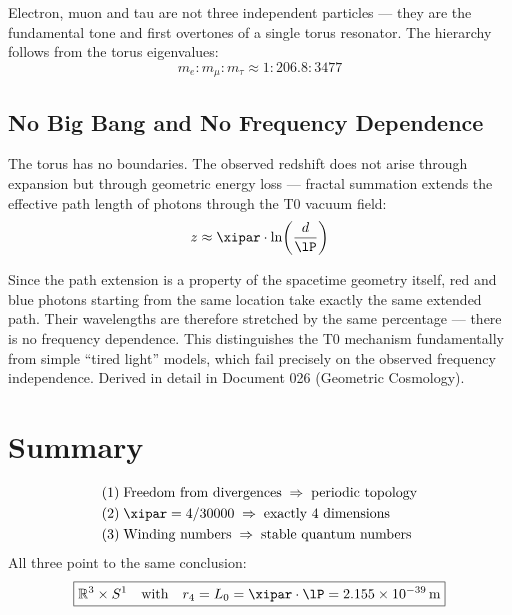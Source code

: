 Electron, muon and tau are not three independent particles — they are the fundamental tone and first overtones of a single torus resonator. The hierarchy follows from the torus eigenvalues:
\begin{equation}
	m_e : m_\mu : m_\tau \approx 1 : 206{.}8 : 3477
\end{equation}

\subsection{No Big Bang and No Frequency Dependence}

The torus has no boundaries. The observed redshift does not arise through expansion but through geometric energy loss — fractal summation extends the effective path length of photons through the T0 vacuum field:
\begin{equation}
	z \approx \xipar \cdot \ln\!\left(\frac{d}{\lP}\right)
\end{equation}

\begin{keypoint}
Since the path extension is a property of the spacetime geometry itself, red and blue photons starting from the same location take exactly the same extended path. Their wavelengths are therefore stretched by the same percentage — there is no frequency dependence. This distinguishes the T0 mechanism fundamentally from simple ``tired light'' models, which fail precisely on the observed frequency independence. Derived in detail in Document 026 (Geometric Cosmology).
\end{keypoint}

\section{Summary}

\begin{keyresult}
\begin{align}
	(1)\; & \text{Freedom from divergences} \;\Rightarrow\; \text{periodic topology} \notag \\
	(2)\; & \xipar = 4/30000 \;\Rightarrow\; \text{exactly 4 dimensions} \notag \\
	(3)\; & \text{Winding numbers} \;\Rightarrow\; \text{stable quantum numbers} \notag
\end{align}
All three point to the same conclusion:
\begin{equation}
	\boxed{\mathbb{R}^3 \times S^1 \quad \text{with} \quad r_4 = L_0 = \xipar \cdot \lP = 2{.}155 \times 10^{-39}\,\text{m}}
\end{equation}
\end{keyresult}

